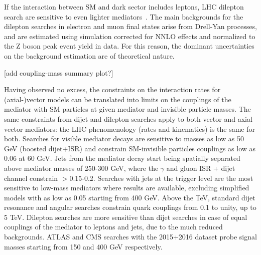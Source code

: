 If the interaction between SM and dark sector includes leptons, LHC dilepton search are sensitive to even lighter mediators~\cite{Aaboud:2017buh,Khachatryan:2016zqb}. 
The main backgrounds for the dilepton searches in electron and muon final states arise from Drell-Yan processes, and are estimated using simulation corrected for NNLO effects and normalized to the Z boson peak event yield in data. For this reason, the dominant uncertainties on the background estimation are of theoretical nature. 



[add coupling-mass summary plot?]

Having observed no excess, the constraints on the interaction rates for (axial-)vector models can be translated into limits on the couplings of the mediator with SM particles at given mediator and invisible particle masses. 
The same constraints from dijet and dilepton searches apply to both vector and axial vector mediators: the LHC phenomenology (rates and kinematics) is the same for both. 
Searches for visible mediator decays are sensitive to masses as low as 50 GeV (boosted dijet+ISR) and constrain SM-invisible particles couplings \gq as low as 0.06 at 60 GeV. Jets from the mediator decay start being spatially separated above mediator masses of 250-300 GeV, where the $\gamma$ and gluon ISR + dijet channel constrain \gq$>$0.15-0.2. Searches with jets at the trigger level are the most sensitive to low-mass mediators where results are available, excluding simplified models with \gq as low as 0.05 starting from 400 GeV. Above the TeV, standard dijet resonance and angular searches constrain quark couplings from 0.1 to unity, up to 5 TeV. 
Dilepton searches are more sensitive than dijet searches in case of equal couplings of the mediator to leptons and jets, due to the much reduced backgrounds. ATLAS and CMS searches with the 2015+2016 dataset probe signal masses starting from 150 and 400 GeV respectively. 

